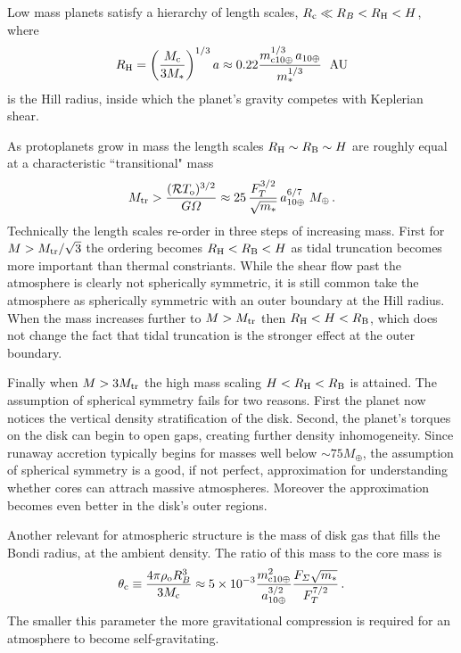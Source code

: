 \documentclass[12pt, preprint,numberedappendix]{emulateapj}
\newcommand{\AU}{\; {\rm AU}}
\newcommand{\Rg}{\mathcal{R}}
\newcommand{\co}{_{\rm c}}
\newcommand{\di}{_{\rm o}}
\newcommand{\mcn}[1] { m_{ \rm c #1 \oplus} }
\newcommand{\au}{a_\oplus}
\newcommand{\aun}[1]{ a_{#1\oplus} }
\begin{document}
Low mass planets satisfy a hierarchy of length scales,  $R\co \ll R_B < R_{\rm H} < H$, where %
\begin{equation} 
R_{\rm H} = \left(M\co \over 3 M_\ast \right)^{1/3}a \approx 0.22 {\mcn{10}^{1/3} \, \aun{10} \over m_\ast^{1/3}}~\AU
\end{equation} 
is the Hill radius, inside which the planet's gravity competes with Keplerian shear.

As protoplanets grow in mass the length scales $R_{\rm H} \sim R_{\rm B} \sim H$ are roughly equal at a characteristic ``transitional" mass
\begin{equation}
M_{\rm tr} > {(\Rg T\di)^{3/2} \over G \varOmega} \approx 25 \, {F_T^{3/2} \over \sqrt{m_\ast} } \, \aun{10}^{6/7}~ M_\oplus \, .
\end{equation} 
Technically the length scales re-order in three steps of increasing mass.  First for $M > M_{\rm tr}/\sqrt{3}$ the ordering becomes $R_{\rm H} < R_{\rm B} < H$ as tidal truncation becomes more important than thermal constriants.  While the shear flow past the atmosphere is clearly not spherically symmetric, it is still common take the atmosphere as spherically symmetric with an outer boundary at the Hill radius.  When the mass increases further to $M > M_{\rm tr}$ then  $R_{\rm H} < H < R_{\rm B}$, which does not change the fact that tidal truncation is the stronger effect at the outer boundary. 

Finally when $M > 3 M_{\rm tr}$ the high mass scaling $H < R_{\rm H} < R_{\rm B}$ is attained.  The assumption of spherical symmetry fails for two reasons.  First the planet now notices the vertical density stratification of the disk.  Second, the planet's torques on the disk can begin to open gaps, creating further density inhomogeneity.  Since runaway accretion typically begins for masses well below $\sim 75 M_\oplus$, the assumption of spherical symmetry is a good, if not perfect, approximation for understanding whether cores can attrach massive atmospheres.  Moreover the approximation becomes even better in the disk's outer regions.

Another relevant for atmospheric structure is the mass of disk gas that fills the Bondi radius, at the ambient density.  The ratio of this mass to the core mass is 
\begin{equation}
\theta\co \equiv { 4 \pi \rho\di R_B^3 \over 3 M\co} \approx 5 \times 10^{-3} {\mcn{10}^2 \over \aun{10}^{3/2}}{F_\varSigma \sqrt{m_\ast} \over F_T^{7/2}}\, .
\end{equation} 
The smaller this parameter the more gravitational compression is required for an atmosphere to become self-gravitating.
\end{document}
